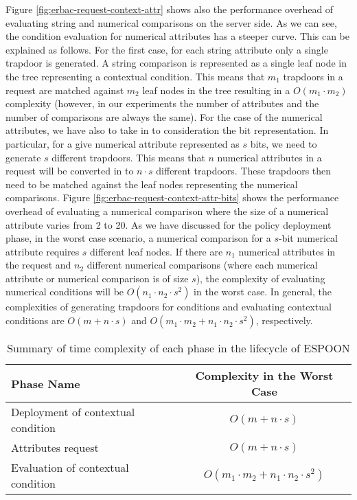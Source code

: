 \documentclass[epsfig,a4paper,11pt,titlepage]{book}
\numberwithin{algorithm}{chapter}
\begin{document}
Figure \ref{fig:erbac-request-context-attr} shows also the performance overhead of evaluating string and numerical comparisons on the server side. As we can see, the condition evaluation for numerical attributes has a steeper curve. This can be explained as follows. For the first case, for each string attribute only a single trapdoor is generated. A string comparison is represented as a single leaf node in the tree representing a contextual condition. This means that $m_1$ trapdoors in a request are matched against $m_2$ leaf nodes in the tree resulting in a $O(m_1 \cdot m_2)$ complexity (however, in our experiments the number of attributes and the number of comparisons are always the same). For the case of the numerical attributes, we have also to take in to consideration the bit representation. In particular, for a give numerical attribute represented as $s$ bits, we need to generate $s$ different trapdoors. This means that $n$ numerical attributes in a request will be converted in to $n \cdot s$ different trapdoors. These trapdoors then need to be matched against the leaf nodes representing the numerical comparisons. Figure \ref{fig:erbac-request-context-attr-bits} shows the performance overhead of evaluating a numerical comparison where the size of a numerical attribute varies from 2 to 20. As we have discussed for the policy deployment phase, in the worst case scenario, a numerical comparison for a $s$-bit numerical attribute requires $s$ different leaf nodes. If there are $n_1$ numerical attributes in the request and $n_2$ different numerical comparisons (where each numerical attribute or numerical comparison is of size $s$), the complexity of evaluating numerical conditions will be $O(n_1 \cdot n_2 \cdot s^2)$ in the worst case. In general, the complexities of generating trapdoors for conditions and evaluating contextual conditions are $O (m + n \cdot s)$ and $O(m_1 \cdot m_2 + n_1 \cdot n_2 \cdot s^2)$, respectively.

\begin{table} [htp]
\centering
\caption[Time complexity of each phase in the lifecycle of ESPOON]{Summary of time complexity of each phase in the lifecycle of \gls{ESPOON}}
\label{tab:espoon-complexity-summary}
\begin{tabular}{ |l|c| } 

\hline

\textbf{Phase Name} & \textbf{Complexity in the Worst Case} \\ \hline

Deployment of contextual condition & $O (m + n \cdot s)$ \\ \hline

Attributes request & $O (m + n \cdot s)$ \\ \hline

Evaluation of contextual condition & $O (m_1 \cdot m_2 + n_1 \cdot n_2 \cdot s^2)$ \\ \hline

\end{tabular}

\end{table}
\end{document}
